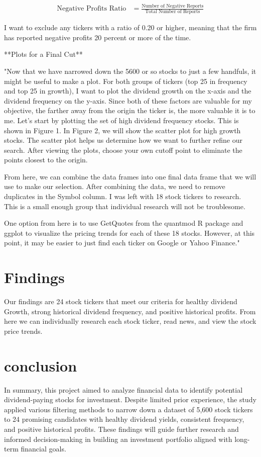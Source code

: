 \documentclass[12pt]{article}
\begin{document}
\begin{align*}
\text{Negative Profits Ratio} &= \frac{\text{Number of Negative Reports}}{\text{Total Number of Reports}}
\end{align*}

I want to exclude any tickers with a ratio of 0.20 or higher, meaning that the firm has reported negative profits 20 percent or more of the time.

**Plots for a Final Cut**

"Now that we have narrowed down the 5600 or so stocks to just a few handfuls, it might be useful to make a plot. For both groups of tickers (top 25 in frequency and top 25 in growth), I want to plot the dividend growth on the x-axis and the dividend frequency on the y-axis. Since both of these factors are valuable for my objective, the farther away from the origin the ticker is, the more valuable it is to me. Let’s start by plotting the set of high dividend frequency stocks. This is shown in Figure 1. In Figure 2, we will show the scatter plot for high growth stocks. The scatter plot helps us determine how we want to further refine our search. After viewing the plots, choose your own cutoff point to eliminate the points closest to the origin.

From here, we can combine the data frames into one final data frame that we will use to make our selection. After combining the data, we need to remove duplicates in the Symbol column. I was left with 18 stock tickers to research. This is a small enough group that individual research will not be troublesome.

One option from here is to use GetQuotes from the quantmod R package and ggplot to visualize the pricing trends for each of these 18 stocks. However, at this point, it may be easier to just find each ticker on Google or Yahoo Finance."

\section{Findings}

Our findings are 24 stock tickers that meet our criteria for healthy dividend Growth, strong historical dividend frequency, and positive historical profits. From here we can individually research each stock ticker, read news, and view the stock price trends. 

\section{conclusion}
In summary, this project aimed to analyze financial data to identify potential dividend-paying stocks for investment. Despite limited prior experience, the study applied various filtering methods to narrow down a dataset of 5,600 stock tickers to 24 promising candidates with healthy dividend yields, consistent frequency, and positive historical profits. These findings will guide further research and informed decision-making in building an investment portfolio aligned with long-term financial goals.
\end{document}
